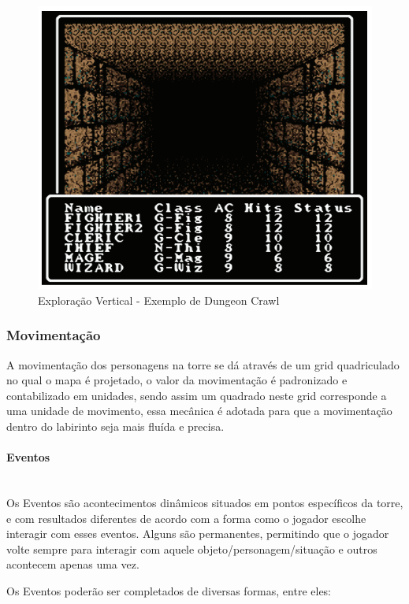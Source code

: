 \documentclass[11pt]{article} %
\begin{document}
\begin{figure}[!htp]
\centering
\includegraphics[scale=0.3]{res/Dungeon_Crawler.png}
\caption{Exploração Vertical - Exemplo de Dungeon Crawl}
\label{Exploração Vertical - Exemplo de Dungeon Crawl}
\end{figure}

\subsubsection{Movimentação}
A movimentação dos personagens na torre se dá através de um grid quadriculado no qual o mapa é projetado, o valor da movimentação é padronizado e contabilizado em unidades, sendo assim um quadrado neste grid corresponde a uma unidade de movimento, essa mecânica é adotada para que a movimentação dentro do labirinto seja mais fluída e precisa.

\paragraph{Eventos} \mbox{}\\
Os Eventos são acontecimentos dinâmicos situados em pontos específicos da torre, e com resultados diferentes de acordo com a forma como o jogador escolhe interagir com esses eventos. Alguns são permanentes, permitindo que o jogador volte sempre para interagir com aquele objeto/personagem/situação e outros acontecem apenas uma vez.

Os Eventos poderão ser completados de diversas formas, entre eles:
\end{document}
